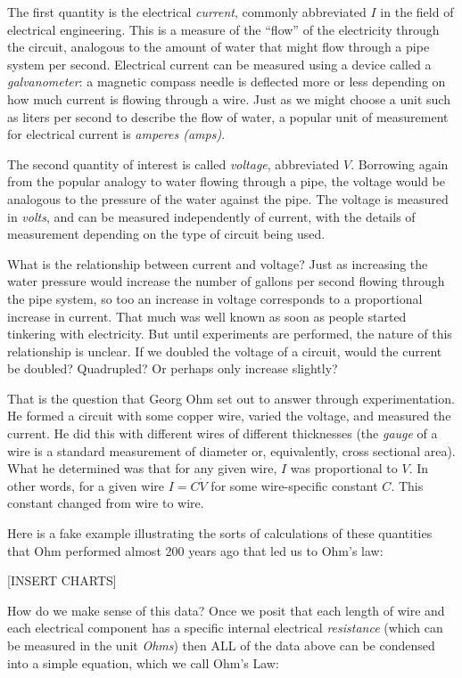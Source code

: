 \documentclass[UTF8]{book}
\begin{document}
\begin{CJK}{UTF8}{gbsn}
The first quantity is the electrical \emph{current}, commonly abbreviated $I$ in the field of electrical engineering. This is a measure of the ``flow'' of the electricity through the circuit, analogous to the amount of water that might flow through a pipe system per second. Electrical current can be measured using a device called a \emph{galvanometer}: a magnetic compass needle is deflected more or less depending on how much current is flowing through a wire. Just as we might choose a unit such as liters per second to describe the flow of water, a popular unit of measurement for electrical current is \emph{amperes (amps)}.

The second quantity of interest is called \emph{voltage}, abbreviated $V$. Borrowing again from the popular analogy to water flowing through a pipe, the voltage would be analogous to the pressure of the water against the pipe. The voltage is measured in \emph{volts}, and can be measured independently of current, with the details of measurement depending on the type of circuit being used.

What is the relationship between current and voltage? Just as increasing the water pressure would increase the number of gallons per second flowing through the pipe system, so too an increase in voltage corresponds to a proportional increase in current. That much was well known as soon as people started tinkering with electricity. But until experiments are performed, the nature of this relationship is unclear. If we doubled the voltage of a circuit, would the current be doubled? Quadrupled? Or perhaps only increase slightly?

That is the question that Georg Ohm set out to answer through experimentation. He formed a circuit with some copper wire, varied the voltage, and measured the current. He did this with different wires of different thicknesses (the \emph{gauge} of a wire is a standard measurement of diameter or, equivalently, cross sectional area). What he determined was that for any given wire, $I$ was proportional to $V$. In other words, for a given wire $I = C \dot V$ for some wire-specific constant $C$. This constant changed from wire to wire.

Here is a fake example illustrating the sorts of calculations of these quantities that Ohm performed almost 200 years ago that led us to Ohm's law:

[INSERT CHARTS]

How do we make sense of this data? Once we posit that each length of wire and each electrical component has a specific internal electrical \emph{resistance} (which can be measured in the unit \emph{Ohms}) then ALL of the data above can be condensed into a simple equation, which we call Ohm's Law:


\end{CJK}
\end{document}
